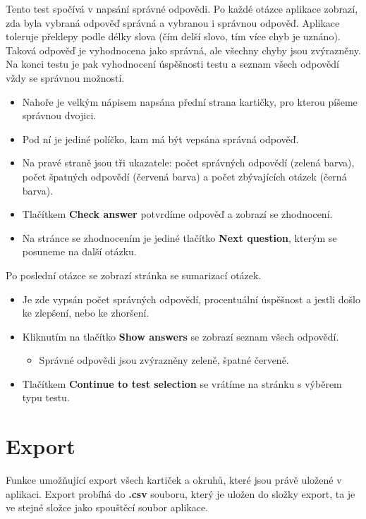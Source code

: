 \documentclass[12pt]{article}
\providecommand{\tightlist}{\setlength{\itemsep}{1pt}\setlength{\parskip}{1pt}}
\begin{document}
Tento test spočívá v napsání správné odpovědi. Po každé otázce aplikace
zobrazí, zda byla vybraná odpověď správná a vybranou i správnou odpověď.
Aplikace toleruje překlepy podle délky slova (čím delší slovo, tím více
chyb je uznáno). Taková odpověď je vyhodnocena jako správná, ale všechny
chyby jsou zvýrazněny. Na konci testu je pak vyhodnocení úspěšnosti
testu a seznam všech odpovědí vždy se správnou možností.

\begin{itemize}
\tightlist
\item
  Nahoře je velkým nápisem napsána přední strana kartičky, pro kterou
  píšeme správnou dvojici.
\item
  Pod ní je jediné políčko, kam má být vepsána správná odpověď.
\item
  Na pravé straně jsou tři ukazatele: počet správných odpovědí (zelená
  barva), počet špatných odpovědí (červená barva) a počet zbývajících
  otázek (černá barva).
\item
  Tlačítkem \textbf{Check answer} potvrdíme odpověď a zobrazí se
  zhodnocení.
\item
  Na stránce se zhodnocením je jediné tlačítko \textbf{Next question},
  kterým se posuneme na další otázku.
\end{itemize}

Po poslední otázce se zobrazí stránka se sumarizací otázek.

\begin{itemize}
\tightlist
\item
  Je zde vypsán počet správných odpovědí, procentuální úspěšnost a
  jestli došlo ke zlepšení, nebo ke zhoršení.
\item
  Kliknutím na tlačítko \textbf{Show answers} se zobrazí seznam všech
  odpovědí.

  \begin{itemize}
  \tightlist
  \item
    Správné odpovědi jsou zvýrazněny zeleně, špatné červeně.
  \end{itemize}
\item
  Tlačítkem \textbf{Continue to test selection} se vrátíme na stránku s
  výběrem typu testu.
\end{itemize}

\hypertarget{export}{%
\section{Export}\label{export}}

Funkce umožňující export všech kartiček a okruhů, které jsou právě
uložené v aplikaci. Export probíhá do \textbf{.csv} souboru, který je
uložen do složky export, ta je ve stejné složce jako spouštěcí soubor
aplikace.
\end{document}
